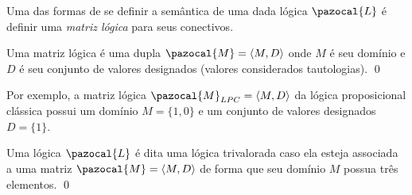 Uma das formas de se definir a semântica de uma dada lógica $\pazocal{L}$ é definir uma \textit{matriz lógica} para seus conectivos. 
\begin{definicao}
    Uma matriz lógica é uma dupla $\pazocal{M} = \langle M, D \rangle$ onde $M$ é seu domínio e $D$ é seu conjunto de valores designados (valores considerados tautologias). \qed{}
\end{definicao}
Por exemplo, a matriz lógica $\pazocal{M}_{LPC} = \langle M, D \rangle$ da lógica proposicional clássica possui um domínio $M = \{1, 0\}$ e um conjunto de valores designados $D = \{1\}$.
\begin{definicao}
    Uma  lógica $\pazocal{L}$ é dita uma lógica trivalorada caso ela esteja associada a uma matriz $\pazocal{M} = \langle M, D \rangle$ de forma que seu domínio $M$ possua três elementos.
    \qed{}
\end{definicao}

